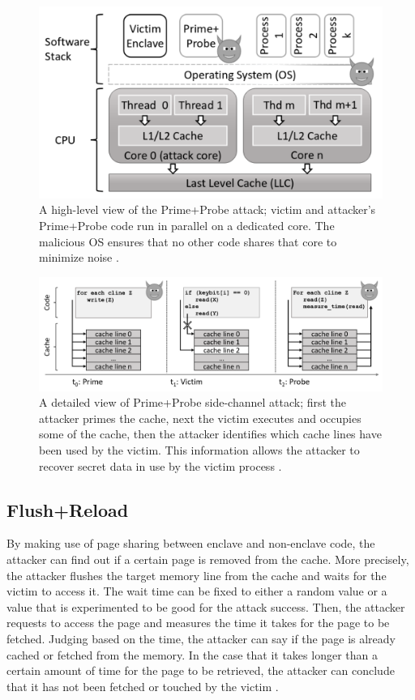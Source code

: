 \begin{figure}
	\includegraphics[scale=0.2]{images/pp1}
	\caption{A high-level view of the Prime+Probe attack; victim and attacker’s Prime+Probe code run in parallel on a dedicated core. The malicious OS  ensures  that  no  other  code shares that core to minimize noise \cite{brasser2017software}.}
	\label{fig:ppone}
\end{figure}
\begin{figure}
	\includegraphics[scale=0.2]{images/pp2}
	\caption{A detailed view of Prime+Probe side-channel attack; first the attacker primes the cache, next the victim executes and occupies some of the cache, then the attacker identifies which cache lines have been used by the victim. This information allows the attacker to recover secret data in use by the victim process \cite{brasser2017software}.}
	\label{fig:pptwo}
\end{figure}

\subsection{Flush+Reload}
By making use of page sharing between enclave and non-enclave code, the attacker can find out if a certain page is removed from the cache. More precisely, the attacker flushes the target memory line from the cache and waits for the victim to access it. The wait time can be fixed to either a random value or a value that is experimented to be good for the attack success. Then, the attacker requests to access the page and measures the time it takes for the page to be fetched. Judging based on the time, the attacker can say if the page is already cached or fetched from the memory. In the case that it takes longer than a certain amount of time for the page to be retrieved, the attacker can conclude that it has not been fetched or touched by the victim \cite{flushreload}.

